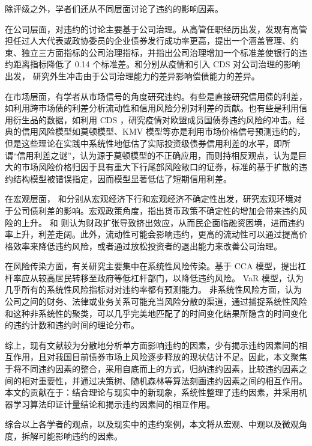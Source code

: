 除评级之外，学者们还从不同层面讨论了违约的影响因素。

在公司层面，对违约的讨论主要基于公司治理。\Textcite{林晚发2018高管任职经历的得与失}从高管任职经历出发，发现有高管担任过人大代表或政协委员的企业债券发行成功率更高，\Textcite{anginer2018corporate}提出一个涵盖管理、约束、独立三方面指标的公司治理指标，并指出公司治理增加一个标准差使银行的违约距离指标降低了 0.14 个标准差。\Textcite{ding2021corporate}和\Textcite{subrahmanyam2017credit}分别从疫情和引入 CDS 对公司治理的影响出发， 研究外生冲击由于公司治理能力的差异影响偿债能力的差异。

在市场层面，有学者从市场信号的角度研究违约。有些是直接研究信用债的利差，如\Textcite{纪志宏2017信用风险溢价还是市场流动性溢价}利用跨市场债的利差分析流动性和信用风险分别对利差的贡献。也有些是利用信用衍生品的数据，如\Textcite{bonaccolto2021breakup}利用 CDS ，研究疫情对欧盟成员国债券违约风险的冲击。经典的信用风险模型如莫顿模型、KMV 模型等亦是利用市场价格信号预测违约的，但是这些理论在实践中系统性地低估了实际投资级债券信用利差的水平，即所谓“信用利差之谜”，\Textcite{feldhutter2018myth}认为源于莫顿模型的不正确应用，而\Textcite{bai2020credit}则持相反观点，认为是巨大的市场风险价格归因于具有重大下行尾部风险敞口的证券，标准的基于扩散的违约结构模型被错误指定，因而模型显著低估了短期信用利差。

在宏观层面，\Textcite{bai2019common} 和\Textcite{bali2021macroeconomic}分别从宏观经济下行和宏观经济不确定性出发，研究宏观环境对于公司债利差的影响。宏观政策角度，\Textcite{王博2019货币政策不确定性}指出货币政策不确定性的增加会带来违约风险的上升。\Textcite{梅冬州2021财政扩张} 和\Textcite{2020Fiscal} 则认为财政扩张导致挤出效应，从而民企面临融资困境，进而违约率上升，利差走阔。此外，流动性可能会影响违约\cite{brogaard2017stock}，更高的流动性可以通过提高价格效率来降低违约风险，或者通过放松投资者的退出能力来改善公司治理。

在风险传染方面，有关研究主要集中在系统性风险传染。\Textcite{苟文均2016债务杠杆与系统性风险传染机制}基于 CCA 模型，提出杠杆率应从较高居民转移至政府等低杠杆部门，以降低违约风险。
\Textcite{2020Do} VaR 模型，认为几乎所有的系统性风险指标对对违约率都有预测能力。
非系统性风险方面，\Textcite{azizpour2018exploring}认为公司之间的财务、法律或业务关系可能充当风险分散的渠道，通过捕捉系统性风险和这种非系统性的聚类，可以几乎完美地匹配了的时间变化结果所隐含的时间变化的违约计数和违约时间的理论分布。

综上，现有文献较为分散地分析单方面影响违约的因素，少有揭示违约因素间的相互作用，且对我国目前债券市场上风险逐步释放的现状估计不足。因此，本文聚焦于将不同违约因素的整合，采用自底而上的方式，归纳违约因素，比较违约因素之间的相对重要性，并通过决策树、随机森林等算法刻画违约因素之间的相互作用。
本文的贡献在于：结合理论与现实中的新现象，系统性整理了违约因素，并采用机器学习算法印证计量结论和揭示违约因素间的相互作用。

综合以上各学者的观点，以及现实中的违约案例，本文将从宏观、中观以及微观角度，拆解可能影响违约的因素。
